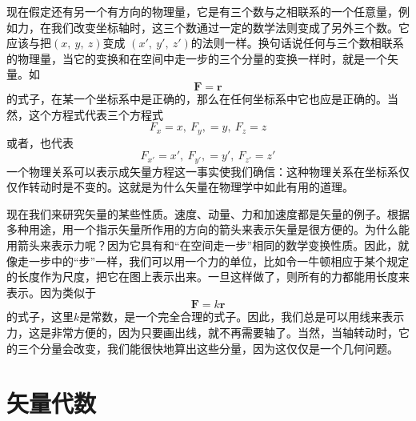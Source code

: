 现在假定还有另一个有方向的物理量，它是有三个数与之相联系的一个任意量，例如力，在我们改变坐标轴时，这三个数通过一定的数学法则变成了另外三个数。它应该与把$(x,~y,~z)$变成	$(x',~y',~z')$的法则一样。换句话说任何与三个数相联系的物理量，当它的变换和在空间中走一步的三个分量的变换一样时，就是一个矢量。如
\begin{equation*}
    \boldsymbol{F}=\boldsymbol{r}
\end{equation*}
的式子，在某一个坐标系中是正确的，那么在任何坐标系中它也应是正确的。当然，这个方程式代表三个方程式
\begin{equation*}
    F_x=x,~F_y,=y,~F_z=z
\end{equation*}
或者，也代表
\begin{equation*}
    F_{x'}=x',~F_{y'},=y',~F_{z'}=z'
\end{equation*}
一个物理关系可以表示成矢量方程这一事实使我们确信：这种物理关系在坐标系仅仅作转动时是不变的。这就是为什么矢量在物理学中如此有用的道理。

现在我们来研究矢量的某些性质。速度、动量、力和加速度都是矢量的例子。根据多种用途，用一个指示矢量所作用的方向的箭头来表示矢量是很方便的。为什么能用箭头来表示力呢？因为它具有和“在空间走一步”相同的数学变换性质。因此，就像走一步中的“步”一样，我们可以用一个力的单位，比如令一牛顿相应于某个规定的长度作为尺度，把它在图上表示出来。一旦这样做了，则所有的力都能用长度来表示。因为类似于
\begin{equation*}
    \boldsymbol{F}=k\boldsymbol{r}
\end{equation*}
的式子，这里$k$是常数，是一个完全合理的式子。因此，我们总是可以用线来表示力，这是非常方便的，因为只要画出线，就不再需要轴了。当然，当轴转动时，它的三个分量会改变，我们能很快地算出这些分量，因为这仅仅是一个几何问题。

\section{矢量代数}

